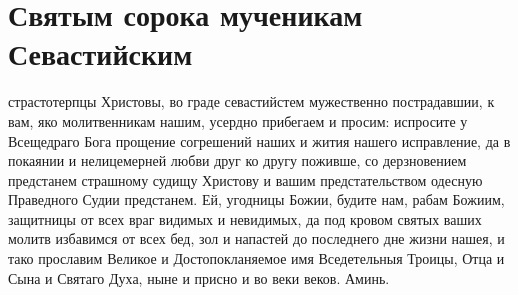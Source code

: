 \documentclass{book}
\newcommand{\mychapter}[1]{
    \chapter{#1}
}
\newenvironment{mymulticols}[1]{}{}
\newcommand{\mychapterending}[1][2.5]{}
\begin{document}
\mychapterending

\mychapter{Святым сорока мученикам Севастийским}\begin{mymulticols}

О страстотерпцы Христовы, во граде севастийстем мужественно пострадавшии, к вам, яко молитвенникам нашим, усердно прибегаем и просим: испросите у Всещедраго Бога прощение согрешений наших и жития нашего исправление, да в покаянии и нелицемерней любви друг ко другу поживше, со дерзновением предстанем страшному судищу Христову и вашим предстательством одесную Праведного Судии предстанем. Ей, угодницы Божии, будите нам, рабам Божиим, защитницы от всех враг видимых и невидимых, да под кровом святых ваших молитв избавимся от всех бед, зол и напастей до последнего дне жизни нашея, и тако прославим Великое и Достопокланяемое имя Вседетельныя Троицы, Отца и Сына и Святаго Духа, ныне и присно и во веки веков. Аминь.

\end{mymulticols}

\mychapterending
\end{document}
